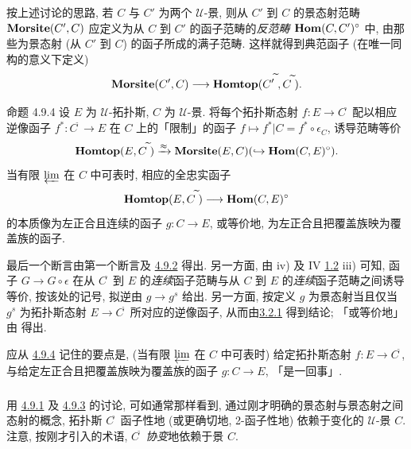 \subsubsection{}
按上述讨论的思路, 若 $C$ 与 $C'$ 为两个 $𝒰$-景, 则从 $C'$ 到 $C$ 的景态射范畴 $\operatorname{\mathbf{Morsite}}(C',C)$ 应定义为从 $C$ 到 $C'$ 的函子范畴的\emph{反范畴 $\operatorname{\mathbf{Hom}}(C,C')^{\circ}$} 中, 由那些为景态射 (从 $C'$ 到 $C$) 的函子所成的满子范畴. 这样就得到典范函子 (在唯一同构的意义下定义)
$$
\operatorname{\mathbf{Morsite}}(C',C)\longrightarrow
\operatorname{\mathbf{Homtop}}({C'}^{\widetilde{\phantom{,}}},
C^{\widetilde{\phantom{,}}}){}.
$$

\begin{enonce*}{命题 4.9.4}
设 $E$ 为 $𝒰$-拓扑斯, $C$ 为 $𝒰$-景. 将每个拓扑斯态射 $f:E\rightarrow C^{\widetilde{\phantom{,}}}$ 配以相应逆像函子 $f^{\ast}:C^{\widetilde{\phantom{,}}}\rightarrow E$ 在 $C$ 上的「限制」的函子 $f\mapsto f^{\ast}| C=f^{\ast}\circ\epsilon_C$, 诱导范畴等价
$$
\operatorname{\mathbf{Homtop}}(E,C^{\widetilde{\phantom{,}}})\xrightarrow{\approx}\operatorname{\mathbf{Morsite}}(E,C)(\hookrightarrow
\operatorname{\mathbf{Hom}}(C,E)^{\circ}){}.
$$
当有限 $\varprojlim$ 在 $C$ 中可表时, 相应的全忠实函子
$$
\operatorname{\mathbf{Homtop}}(E,C^{\widetilde{\phantom{,}}})\longrightarrow
\operatorname{\mathbf{Hom}}(C,E)^{\circ}
$$
的本质像为左正合且连续的函子 $g:C\rightarrow E$, 或等价地, 为左正合且把\pageoriginale 覆盖族映为覆盖族的函子.
\end{enonce*}

最后一个断言由第一个断言及 \hyperref[IV.subsubsec4.9.2]{4.9.2} 得出. 另一方面, 由  iv) 及 IV \hyperref[IV.theo1.2]{1.2} iii) 可知, 函子 $G\rightarrow G\circ\epsilon$ 在从 $C^{\widetilde{\phantom{,}}}$ 到 $E$ 的\emph{连续}函子范畴与从 $C$ 到 $E$ 的\emph{连续}函子范畴之间诱导等价, 按该处的记号, 拟逆由 $g\rightarrow g^s$ 给出. 另一方面, 按定义 $g$ 为景态射当且仅当 $g^s$ 为拓扑斯态射 $E\rightarrow C^{\widetilde{\phantom{,}}}$ 所对应的逆像函子, 从而由\hyperlink{sga4.exp.IV.subsubsection.3.2.1}{3.2.1} 得到结论; 「或等价地」由  得出.

应从 \hyperref[IV.prop4.9.4]{4.9.4} 记住的要点是, (当有限 $\varprojlim$ 在 $C$ 中可表时) 给定拓扑斯态射 $f:E\rightarrow C^{\widetilde{\phantom{,}}}$, 与给定左正合且把覆盖族映为覆盖族的函子 $g:C\rightarrow E$, 「是一回事」.

\setcounter{subsubsection}{4}
\subsubsection{}
用 \hyperref[IV.subsubsec4.9.1]{4.9.1} 及 \hyperref[IV.subsubsec4.9.3]{4.9.3} 的讨论, 可如通常那样看到, 通过刚才明确的景态射与景态射之间态射的概念, 拓扑斯 $C^{\widetilde{\phantom{,}}}$ 函子性地 (或更确切地, 2-函子性地) 依赖于变化的 $𝒰$-景 $C$. 注意, 按刚才引入的术语, $C^{\widetilde{\phantom{,}}}$ \emph{协变}地依赖于景 $C$.

